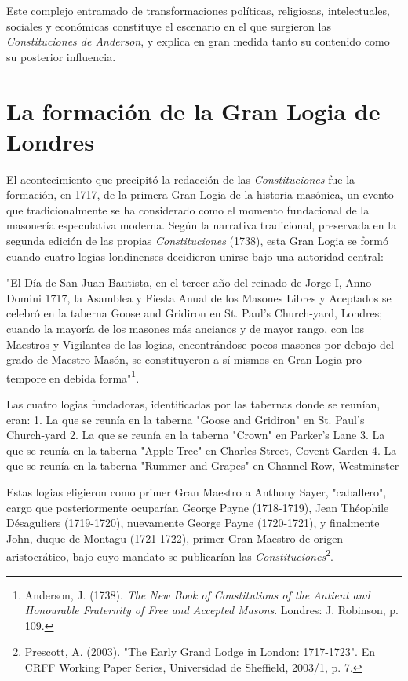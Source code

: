 \documentclass[a4paper,12pt,twoside]{book}
\begin{document}
Este complejo entramado de transformaciones políticas, religiosas, intelectuales, sociales y económicas constituye el escenario en el que surgieron las \textit{Constituciones de Anderson}, y explica en gran medida tanto su contenido como su posterior influencia.

\section{La formación de la Gran Logia de Londres}

El acontecimiento que precipitó la redacción de las \textit{Constituciones} fue la formación, en 1717, de la primera Gran Logia de la historia masónica, un evento que tradicionalmente se ha considerado como el momento fundacional de la masonería especulativa moderna. Según la narrativa tradicional, preservada en la segunda edición de las propias \textit{Constituciones} (1738), esta Gran Logia se formó cuando cuatro logias londinenses decidieron unirse bajo una autoridad central:

"El Día de San Juan Bautista, en el tercer año del reinado de Jorge I, Anno Domini 1717, la Asamblea y Fiesta Anual de los Masones Libres y Aceptados se celebró en la taberna Goose and Gridiron en St. Paul's Church-yard, Londres; cuando la mayoría de los masones más ancianos y de mayor rango, con los Maestros y Vigilantes de las logias, encontrándose pocos masones por debajo del grado de Maestro Masón, se constituyeron a sí mismos en Gran Logia pro tempore en debida forma"\footnote{Anderson, J. (1738). \textit{The New Book of Constitutions of the Antient and Honourable Fraternity of Free and Accepted Masons}. Londres: J. Robinson, p. 109.}.

Las cuatro logias fundadoras, identificadas por las tabernas donde se reunían, eran: 
1. La que se reunía en la taberna "Goose and Gridiron" en St. Paul's Church-yard
2. La que se reunía en la taberna "Crown" en Parker's Lane
3. La que se reunía en la taberna "Apple-Tree" en Charles Street, Covent Garden
4. La que se reunía en la taberna "Rummer and Grapes" en Channel Row, Westminster

Estas logias eligieron como primer Gran Maestro a Anthony Sayer, "caballero", cargo que posteriormente ocuparían George Payne (1718-1719), Jean Théophile Désaguliers (1719-1720), nuevamente George Payne (1720-1721), y finalmente John, duque de Montagu (1721-1722), primer Gran Maestro de origen aristocrático, bajo cuyo mandato se publicarían las \textit{Constituciones}\footnote{Prescott, A. (2003). "The Early Grand Lodge in London: 1717-1723". En CRFF Working Paper Series, Universidad de Sheffield, 2003/1, p. 7.}.
\end{document}
